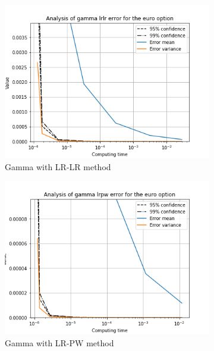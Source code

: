 \documentclass[11pt,a4paper,fleqn]{article}
\begin{document}
\begin{figure}[h!]
      \begin{subfigure}[b]{0.3\textwidth}
          \includegraphics[width=\textwidth]{graphs/eurogammalrlrtime.png}
          \caption{Gamma with LR-LR method}
      \end{subfigure}
      \begin{subfigure}[b]{0.3\textwidth}
          \includegraphics[width=\textwidth]{graphs/eurogammalrpwtime.png}
          \caption{Gamma with LR-PW method}
      \end{subfigure}
      \begin{subfigure}[b]{0.3\textwidth}

\end{subfigure}
\end{figure}
\end{document}

